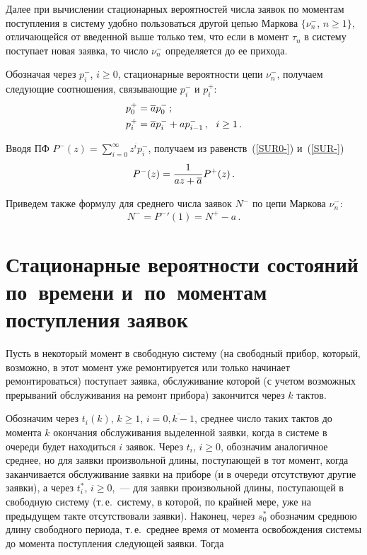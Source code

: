 \begin{multicols}{2}
Далее при вычислении стационарных вероятностей числа заявок
по моментам поступления в систему удобно пользоваться другой
цепью Маркова $\{\nu^-_{n}$, $n\ge 1\}$, отличающейся от
введенной выше только тем, что если в момент $\tau_{n}$ в
систему поступает новая заявка, то число $\nu^-_{n}$
определяется до ее прихода.

Обозначая через $p^{-}_{i}$,  $i\ge 0$, стационарные
вероятности цепи $\nu^-_{n}$, получаем следующие соотношения,
связывающие $p^{-}_{i}$ и $p^{+}_{i}$:
\begin{align}
\label{SUR0-}
p^{+}_{0}&= \overline a p^{-}_{0} \,;
\\
\label{SUR-}
p^{+}_{i} &= \overline a p^{-}_{i} + a p^{-}_{i-1}\,,
\ \ i\ge1\,.
\end{align}

Вводя ПФ $P^{-}(z)=\sum\limits_{i=0}^\infty z^i p^{-}_{i}$,
получаем из равенств~(\ref{SUR0-}) и~(\ref{SUR-})
\begin{equation*}
\label{SUR*}
P^{-}(z)= \displaystyle\frac{\displaystyle 1\mathstrut}{\displaystyle az+\overline a\mathstrut} P^+(z)\,.
\end{equation*}

Приведем также формулу для среднего числа заявок $N^-$
по цепи Маркова $\nu^-_{n}$:
$$
N^-= {P^{-}}'(1) = N^+ - a \,.
$$

\section{Стационарные вероятности состояний по~времени
и~по~моментам поступления заявок}

Пусть в некоторый момент в свободную систему (на свободный
прибор, который, возможно, в этот момент уже ремонтируется
или только начинает ремонтироваться) поступает заявка,
обслуживание которой (с учетом возможных прерываний
обслуживания на ремонт прибора) закончится через $k$ тактов.

Обозначим через $t_i(k)$, $k\ge 1$, $i=\overline{0,k-1}$,
среднее число таких тактов до момента $k$ окончания обслуживания
выделенной заявки, когда в системе в очереди будет находиться $i$
заявок. Через $t_i$, $i\ge 0$, обозначим аналогичное среднее, но
для заявки произвольной длины, поступающей в тот момент, когда
заканчивается обслуживание заявки на приборе (и в очереди
отсутствуют другие заявки), а через $t^*_i$, $i\ge 0$,~--- для
заявки произвольной длины, поступающей в свободную систему (т.\,е.\
систему, в которой, по крайней мере, уже на предыдущем такте
отсутствовали заявки). Наконец, через $s^*_0$ обозначим среднюю
длину свободного периода, т.\,е.\ среднее время от момента
освобождения сис\-те\-мы до момента поступления следующей заявки. Тогда


\end{multicols}
